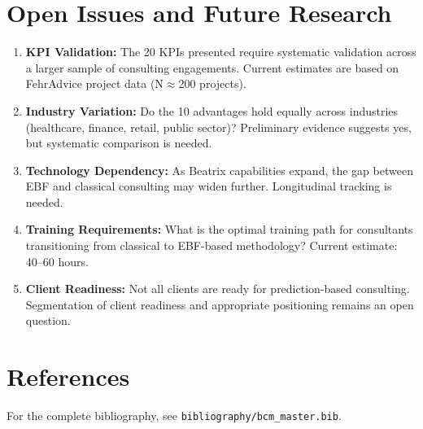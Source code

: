 
\section{Open Issues and Future Research}
\label{sec:consulting-open}

\begin{enumerate}
\item \textbf{KPI Validation:} The 20 KPIs presented require systematic validation
across a larger sample of consulting engagements. Current estimates are based on
FehrAdvice project data (N$\approx$200 projects).

\item \textbf{Industry Variation:} Do the 10 advantages hold equally across industries
(healthcare, finance, retail, public sector)? Preliminary evidence suggests yes,
but systematic comparison is needed.

\item \textbf{Technology Dependency:} As Beatrix capabilities expand, the gap between
EBF and classical consulting may widen further. Longitudinal tracking is needed.

\item \textbf{Training Requirements:} What is the optimal training path for consultants
transitioning from classical to EBF-based methodology? Current estimate: 40--60 hours.

\item \textbf{Client Readiness:} Not all clients are ready for prediction-based consulting.
Segmentation of client readiness and appropriate positioning remains an open question.
\end{enumerate}


\section{References}
\label{sec:consulting-references}

For the complete bibliography, see \texttt{bibliography/bcm\_master.bib}.

